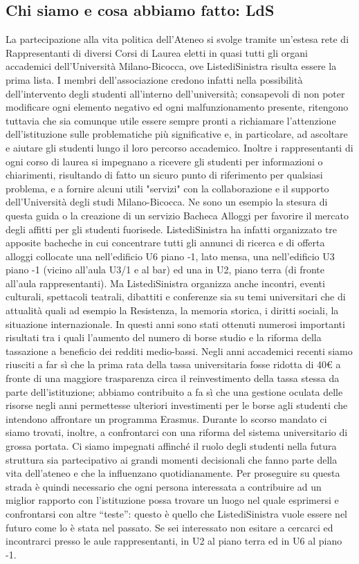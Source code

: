 \subsection{Chi siamo e cosa abbiamo fatto: LdS}
La partecipazione alla vita politica dell'Ateneo si svolge tramite un'estesa rete di Rappresentanti di diversi Corsi di Laurea eletti in quasi tutti gli organi accademici dell'Università Milano-Bicocca, ove ListediSinistra risulta essere la prima lista. I membri dell'associazione credono infatti nella possibilità dell'intervento degli studenti all'interno dell'università; consapevoli di non poter modificare ogni elemento negativo ed ogni malfunzionamento presente, ritengono tuttavia che sia comunque utile essere sempre pronti a richiamare l'attenzione dell'istituzione sulle problematiche più significative e, in particolare, ad ascoltare e aiutare gli studenti lungo il loro percorso accademico.
Inoltre i rappresentanti di ogni corso di laurea si impegnano a ricevere gli studenti per informazioni o chiarimenti, risultando di fatto un sicuro punto di riferimento per qualsiasi problema, e a fornire alcuni utili "servizi" con la collaborazione e il supporto dell'Università degli studi Milano-Bicocca. Ne sono un esempio la stesura di questa guida o la creazione di un servizio Bacheca Alloggi per favorire il mercato degli affitti per gli studenti fuorisede.
ListediSinistra ha infatti organizzato tre apposite bacheche in cui concentrare tutti gli annunci di ricerca e di offerta alloggi collocate una nell'edificio U6 piano -1, lato mensa, una nell'edificio U3 piano -1 (vicino all'aula U3/1 e al bar) ed una in U2, piano terra (di fronte all’aula rappresentanti). Ma ListediSinistra organizza anche incontri, eventi culturali, spettacoli teatrali, dibattiti e conferenze sia su temi universitari che di attualità quali ad esempio la Resistenza, la memoria storica, i diritti sociali, la situazione internazionale.
In questi anni sono stati ottenuti numerosi importanti risultati tra i quali l'aumento del numero di borse studio e la riforma della tassazione a beneficio dei redditi medio-bassi. Negli anni accademici recenti siamo riusciti a far sì che la prima rata della tassa universitaria fosse ridotta di 40€ a fronte di una maggiore trasparenza circa il reinvestimento della tassa stessa da parte dell'istituzione; abbiamo contribuito a fa sì che una gestione oculata delle risorse negli anni permettesse ulteriori investimenti per le borse agli studenti che intendono affrontare un programma Erasmus.
Durante lo scorso mandato ci siamo trovati, inoltre, a confrontarci con una riforma del sistema universitario di grossa portata. Ci siamo impegnati affinché il ruolo degli studenti nella futura struttura sia partecipativo ai grandi momenti decisionali che fanno parte della vita dell'ateneo e che la influenzano quotidianamente.
Per proseguire su questa strada è quindi necessario che ogni persona interessata a contribuire ad un miglior rapporto con l'istituzione possa trovare un luogo nel quale esprimersi e confrontarsi con altre “teste”: questo è quello che ListediSinistra vuole essere nel futuro come lo è stata nel passato. Se sei interessato non esitare a cercarci ed incontrarci presso le aule rappresentanti, in U2 al piano terra ed in U6 al piano -1.

